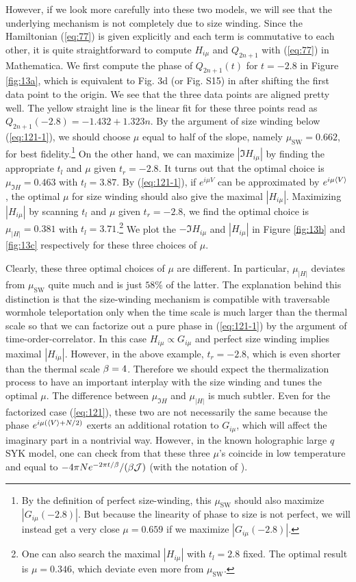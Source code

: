 \documentclass[11pt]{article}
\renewcommand{\>}{\rangle}
\newcommand{\<}{\langle}
\begin{document}
However, if we look more carefully into these two models, we will
see that the underlying mechanism is not completely due to size winding.
Since the Hamiltonian (\ref{eq:77}) is given explicitly and each
term is commutative to each other, it is quite straightforward to
compute $H_{i\mu}$ and $Q_{2n+1}$ with (\ref{eq:77}) in Mathematica.
We first compute the phase of $Q_{2n+1}(t)$ for $t=-2.8$ in Figure
\ref{fig:13a}, which is equivalent to Fig. 3d (or Fig. S15) in \cite{Jafferis:2022crx} 
after shifting the first data point to the origin. We see that the
three data points are aligned pretty well. The yellow straight line
is the linear fit for these three points read as $Q_{2n+1}(-2.8)=-1.432+1.323n$.
By the argument of size winding below (\ref{eq:121-1}), we should
choose $\mu$ equal to half of the slope, namely $\mu_{\text{SW}}=0.662$,
for best fidelity.\footnote{By the definition of perfect size-winding, this $\mu_{\text{SW}}$ should also maximize $|G_{i\mu}(-2.8)|$. But because the linearity of phase to size is not perfect, we will instead get a very close $\mu=0.659$ if we maximize $|G_{i\mu}(-2.8)|$.} On the other hand, we can maximize $|\Im H_{i\mu}|$
by finding the appropriate $t_{l}$ and $\mu$ given $t_{r}=-2.8$.
It turns out that the optimal choice is $\mu_{\Im H}=0.463$ with
$t_{l}=3.87$. By (\ref{eq:121-1}), if $e^{i\mu V}$ can be approximated
by $e^{i\mu\left\langle V\right\rangle}$, the optimal $\mu$ for size winding should also
give the maximal $|H_{i\mu}|$. Maximizing $|H_{i\mu}|$ by scanning
$t_{l}$ and $\mu$ given $t_{r}=-2.8$, we find the optimal choice
is $\mu_{|H|}=0.381$ with $t_{l}=3.71$.\footnote{One can also search the maximal $|H_{i\mu}|$ with $t_{l}=2.8$ fixed.
The optimal result is $\mu=0.346$, which deviate even more from $\mu_{\text{SW}}$. } We plot the $-\Im H_{i\mu}$ and $|H_{i\mu}|$ in Figure \ref{fig:13b}
and \ref{fig:13c} respectively for these three choices of $\mu$. 

Clearly, these three optimal choices of $\mu$ are different. In particular,
$\mu_{|H|}$ deviates from $\mu_{\text{SW}}$ quite much and is just
$58\%$ of the latter. The explanation behind this distinction is
that the size-winding mechanism is compatible with traversable wormhole
teleportation only when the time scale is much larger than the thermal
scale so that we can factorize out a pure phase in (\ref{eq:121-1})
by the argument of time-order-correlator. In this case $H_{i\mu}\propto G_{i\mu}$
and perfect size winding implies maximal $|H_{i\mu}|$. However, in
the above example, $t_{r}=-2.8$, which is even shorter than the thermal
scale $\beta=4$. Therefore we should expect the thermalization process
to have an important interplay with the size winding and tunes the optimal
$\mu$. The difference between $\mu_{\Im H}$ and $\mu_{|H|}$ is
much subtler. Even for the factorized case (\ref{eq:121}), these
two are not necessarily the same because the phase $e^{i\mu(\left\langle V\right\rangle+N/2)}$
exerts an additional rotation to $G_{i\mu}$, which will affect the
imaginary part in a nontrivial way. However, in the known holographic
large $q$ SYK model, one can check from \cite{Gao:2019nyj} that these three
$\mu$'s coincide in low temperature and equal to $-4\pi Ne^{-2\pi t/\beta}/(\beta\mathcal{J})$
(with the notation of \cite{Gao:2019nyj}).
\end{document}

